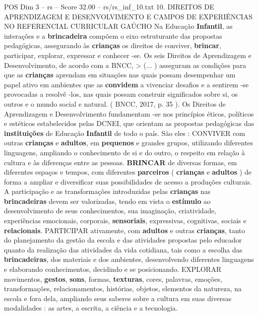\begin{textsample}{POS Dim 3 – rs – Score 32.00 – rs/rs\_inf\_10.txt}  \label{ex:f3_pos_241}
10.
DIREITOS DE APRENDIZAGEM E DESENVOLVIMENTO E CAMPOS DE EXPERIÊNCIAS NO REFERENCIAL CURRICULAR GAÚCHO Na Educação \textbf{Infantil}, as interações e a \textbf{brincadeira} compõem o eixo estruturante das propostas pedagógicas, assegurando às \textbf{crianças} os direitos de conviver, \textbf{brincar}, participar, explorar, expressar e conhecer -se.
Os seis Direitos de Aprendizagem e Desenvolvimento, de acordo com a BNCC, > (... ) asseguram as condições para que as \textbf{crianças} aprendam em situações nas quais possam desempenhar um papel ativo em ambientes que as \textbf{convidem} a vivenciar desafios e a sentirem -se provocadas a resolvê -los, nas quais possam construir significados sobre si, os outros e o mundo social e natural. ( BNCC, 2017, p. 35 ).
Os Direitos de Aprendizagem e Desenvolvimento fundamentam -se nos princípios éticos, políticos e estéticos estabelecidos pelas DCNEI, que orientam as propostas pedagógicas das \textbf{instituições} de Educação \textbf{Infantil} de todo o país.
São eles : CONVIVER com outras \textbf{crianças} e \textbf{adultos}, em \textbf{pequenos} e grandes grupos, utilizando diferentes linguagens, ampliando o conhecimento de si e do outro, o respeito em relação à cultura e às diferenças entre as pessoas. \textbf{BRINCAR} de diversas formas, em diferentes espaços e tempos, com diferentes \textbf{parceiros} ( \textbf{crianças} e \textbf{adultos} ) de forma a ampliar e diversificar suas possibilidades de acesso a produções culturais.
A participação e as transformações introduzidas pelas \textbf{crianças} nas \textbf{brincadeiras} devem ser valorizadas, tendo em vista o \textbf{estímulo} ao desenvolvimento de seus conhecimentos, sua imaginação, criatividade, experiências emocionais, corporais, \textbf{sensoriais}, expressivas, cognitivas, sociais e \textbf{relacionais}.
PARTICIPAR ativamente, com \textbf{adultos} e outras \textbf{crianças}, tanto do planejamento da gestão da escola e das atividades propostas pelo educador quanto da realização das atividades da vida cotidiana, tais como a escolha das \textbf{brincadeiras}, dos materiais e dos ambientes, desenvolvendo diferentes linguagens e elaborando conhecimentos, decidindo e se posicionando.
EXPLORAR movimentos, \textbf{gestos}, \textbf{sons}, formas, \textbf{texturas}, cores, palavras, emoções, transformações, relacionamentos, histórias, objetos, elementos da natureza, na escola e fora dela, ampliando seus saberes sobre a cultura em suas diversas modalidades : as artes, a escrita, a ciência e a tecnologia.

\end{textsample}
